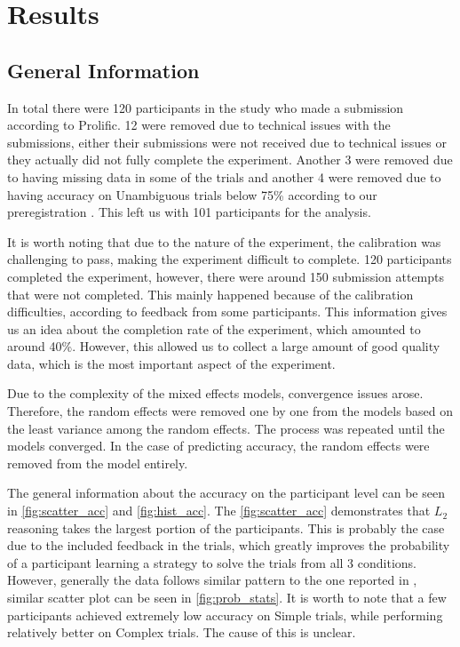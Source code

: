 ﻿\chapter{Results}
\label{chap:results}

\section{General Information}
\label{sec:general_info}
In total there were 120 participants in the study who made a submission according to Prolific. 12 were removed due to technical issues with the submissions, either their submissions were not received due to technical issues or they actually did not fully complete the experiment. Another 3 were removed due to having missing data in some of the trials and another 4 were removed due to having accuracy on Unambiguous trials below 75\% according to our preregistration \citep{preregistration}. This left us with 101 participants for the analysis. 

It is worth noting that due to the nature of the experiment, the calibration was challenging to pass, making the experiment difficult to complete. 120 participants completed the experiment, however, there were around 150 submission attempts that were not completed. This mainly happened because of the calibration difficulties, according to feedback from some participants. This information gives us an idea about the completion rate of the experiment, which amounted to around 40\%. However, this allowed us to collect a large amount of good quality data, which is the most important aspect of the experiment.

Due to the complexity of the mixed effects models, convergence issues arose. Therefore, the random effects were removed one by one from the models based on the least variance among the random effects. The process was repeated until the models converged. In the case of predicting accuracy, the random effects were removed from the model entirely. 

The general information about the accuracy on the participant level can be seen in \autoref{fig:scatter_acc} and \autoref{fig:hist_acc}. The \autoref{fig:scatter_acc} demonstrates that $L_2$ reasoning takes the largest portion of the participants. This is probably the case due to the included feedback in the trials, which greatly improves the probability of a participant learning a strategy to solve the trials from all 3 conditions. However, generally the data follows similar pattern to the one reported in \cite{Franke_2016}, similar scatter plot can be seen in \autoref{fig:prob_stats}. It is worth to note that a few participants achieved extremely low accuracy on Simple trials, while performing relatively better on Complex trials. The cause of this is unclear.

